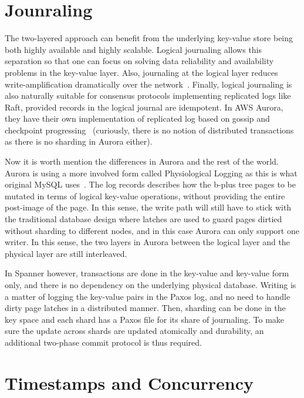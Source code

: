 \section{Jounraling}
The two-layered approach can benefit from the underlying key-value store
being both highly available and highly scalable. Logical journaling allows
this separation so that one can focus on solving data reliability and
availability problems in the key-value layer. Also, journaling at the logical
layer reduces write-amplification dramatically over the
network~\cite{verbitski2017amazon}. Finally, logical journaling is also
naturally suitable for consensus protocols implementing replicated logs like
Raft, provided records in the logical journal are idempotent. In AWS Aurora,
they have their own implementation of replicated log based on gossip and
checkpoint progressing~\cite{verbitski2018amazon} (curiously, there is no
notion of distributed transactions as there is no sharding in Aurora either).

Now it is worth mention the differences in Aurora and the rest of the world.
Aurora is using a more involved form called Physiological Logging as this is
what original MySQL uses~\cite{sippu2015transaction}. The log records
describes how the b-plus tree pages to be mutated in terms of logical
key-value operations, without providing the entire post-image of the page. In
this sense, the write path will still have to stick with the traditional
database design where latches are used to guard pages dirtied without
sharding to different nodes, and in this case Aurora can only support one
writer. In this sense, the two layers in Aurora between the logical layer and
the physical layer are still interleaved.

In Spanner however, transactions are done in the key-value and key-value form
only, and there is no dependency on the underlying physical database. Writing
is  a matter of logging the key-value pairs in the Paxos log, and no need to
handle dirty page latches in a distributed manner. Then, sharding can be done
in the key space and each shard has a Paxos file for its share of journaling.
To make sure the update across shards are updated atomically and durability,
an additional two-phase commit protocol is thus required.

\section{Timestamps and Concurrency}

{}


